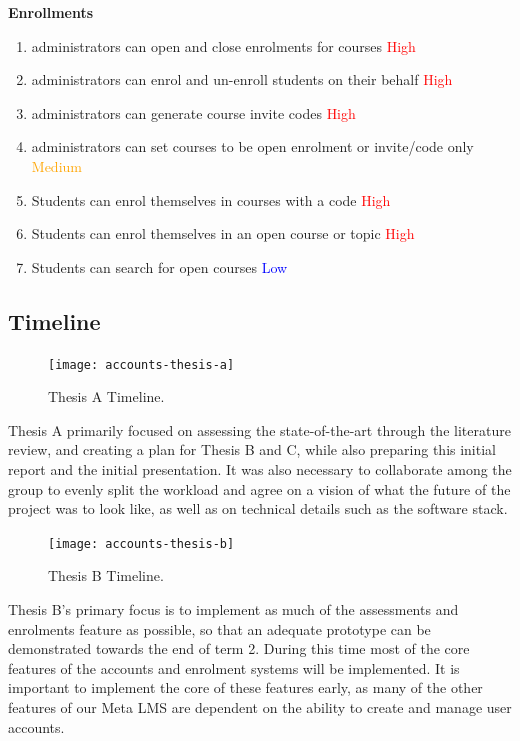 \textbf{Enrollments}
    \begin{enumerate}
    \item administrators can open and close enrolments for courses \textcolor{Red}{High}
    \item administrators can enrol and un-enroll students on their behalf \textcolor{Red}{High}
    \item administrators can generate course invite codes \textcolor{Red}{High}
    \item administrators can set courses to be open enrolment or invite/code only \textcolor{Orange}{Medium}
    \item Students can enrol themselves in courses with a code \textcolor{Red}{High}
    \item Students can enrol themselves in an open course or topic \textcolor{Red}{High}
    \item Students can search for open courses \textcolor{Blue}{Low}
    \end{enumerate}

\subsection{Timeline}

\begin{figure}[h!]
  \centering
  \texttt{[image: accounts-thesis-a]}
  \caption{Thesis A Timeline.}
\end{figure}
Thesis A primarily focused on assessing the state-of-the-art through the literature review, and creating a plan for Thesis B and C, while also preparing this initial report and the initial presentation. It was also necessary to collaborate among the group to evenly split the workload and agree on a vision of what the future of the project was to look like, as well as on technical details such as the software stack.

\begin{figure}[h!]
    \centering
    \texttt{[image: accounts-thesis-b]}
    \caption{Thesis B Timeline.}
\end{figure}
Thesis B's primary focus is to implement as much of the assessments and enrolments feature as possible, so that an adequate prototype can be demonstrated towards the end of term 2. During this time most of the core features of the accounts and enrolment systems will be implemented. It is important to implement the core of these features early, as many of the other features of our Meta LMS are dependent on the ability to create and manage user accounts.

